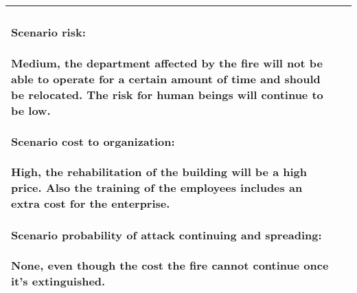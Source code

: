 \begin{longtable}{| p{4cm} | p{8cm} |}
{		\paragraph{Scenario risk:} Medium, the department affected by the fire will not be able to operate for a certain amount of time and should be relocated. The risk for human beings will continue to be low.
		\paragraph{Scenario cost to organization:}High, the rehabilitation of the building will be a high price. Also the training of the  employees includes an extra cost for the enterprise.
		\paragraph{Scenario probability of attack continuing and spreading:}None, even though the cost the fire cannot continue once it's extinguished.
	}\\\hline
	
\end{longtable}


